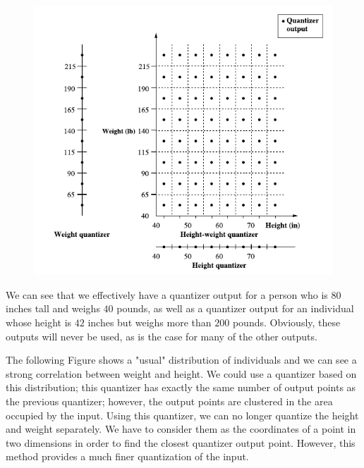 \begin{figure}[H]
    \centering
    \includegraphics[scale=0.55]{images/2021-08-09_vector_quant_01.png}
\end{figure}

We can see that we effectively have a quantizer output for a person who is $80$ inches tall and weighs $40$ pounds, as well as a quantizer output for an individual whose height is $42$ inches but weighs more than $200$ pounds. Obviously, these outputs will never be used, as is the case for many of the other outputs.

The following Figure shows a "usual" distribution of individuals and we can see a strong correlation between weight and height. We could use a quantizer based on this distribution; this quantizer has exactly the same number of output points as the previous quantizer; however, the output points are clustered in the area occupied by the input. Using this quantizer, we can no longer quantize the height and weight separately. We have to consider them as the coordinates of a point in two dimensions in order to find the closest quantizer output point. However, this method provides a much finer quantization of the input.

